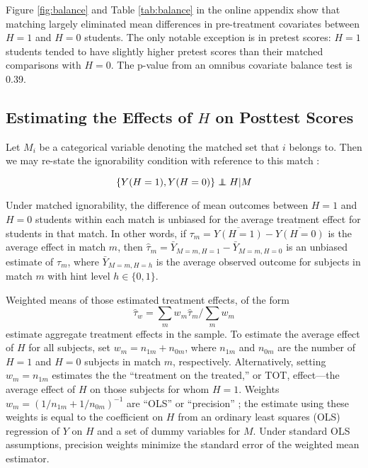 \documentclass{article}\usepackage[]{graphicx}\usepackage[]{color}
\newenvironment{ass}[2][Assumption:]{\begin{trivlist}
\item[\hskip \labelsep {\bfseries #1}\hskip \labelsep {\bfseries #2}.]}{\end{trivlist}}
\def\independenT#1#2{\mathrel{\rlap{$#1#2$}\mkern2mu{#1#2}}}
\newcommand\independent{\protect\mathpalette{\protect\independenT}{\perp}}
\begin{document}
Figure \ref{fig:balance} and Table \ref{tab:balance} in the online appendix show that
matching largely eliminated mean differences in pre-treatment
covariates between $H=1$ and $H=0$ students.
The only notable exception is in pretest scores: $H=1$ students tended
to have slightly higher pretest scores than their matched comparisons
with $H=0$.
The p-value from an omnibus covariate balance test
\citep{covBal} is 0.39.

\subsection{Estimating the Effects of $H$ on Posttest Scores}

Let $M_i$ be a categorical variable denoting the matched set that $i$
belongs to.
Then we may re-state the ignorability condition with reference to this
match \citep[c.f.][]{rebar}:
\begin{ass}{Matched Ignorability}
\begin{equation*}
 \{Y(H=1),Y(H=0)\}\independent H |M
\end{equation*}
\end{ass}
Under matched ignorability, the difference of mean outcomes between $H=1$ and
$H=0$ students within each match is unbiased for the average treatment
effect for students in that match.
In other words, if $\tau_m=\overline{Y(H=1)}-\overline{Y(H=0)}$ is the
average effect in match $m$, then
$\hat{\tau}_m=\bar{Y}_{M=m,H=1}-\bar{Y}_{M=m,H=0}$ is an unbiased
estimate of $\tau_m$, where $\bar{Y}_{M=m,H=h}$ is the average
observed outcome for subjects in match $m$ with hint level
$h\in\{0,1\}$.

Weighted means of those estimated treatment effects, of the form
\begin{equation}\label{eq:tauWeightedMean}
\hat{\tau}_w=\sum_m w_m\hat{\tau}_m/\sum_m w_m
\end{equation}
estimate aggregate
treatment effects in the sample.
To estimate the average effect of $H$ for all subjects, set $w_m=
n_{1m}+n_{0m}$, where $n_{1m}$ and $n_{0m}$ are the number of
$H=1$ and $H=0$ subjects in match $m$, respectively.
Alternatively, setting $w_m=n_{1m}$ estimates the the ``treatment on the
treated,'' or TOT, effect---the average effect of
$H$ on those subjects for whom $H=1$.
Weights $w_m=(1/n_{1m}+1/n_{0m})^{-1}$ are ``OLS'' or
``precision'' \citep[c.f.][]{schochet2015statistical}; the
estimate using these weights is equal to the coefficient on $H$ from
an ordinary least squares (OLS) regression of $Y$ on $H$ and a set of dummy
variables for $M$.
Under standard OLS assumptions, precision weights minimize the
standard error of the weighted mean estimator.
\end{document}
